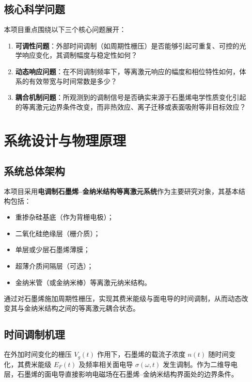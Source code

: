 \documentclass[12pt,a4paper]{article}
\begin{document}
\subsection{核心科学问题}

本项目重点围绕以下三个核心问题展开：

\begin{enumerate}
  \item \textbf{可调性问题}：外部时间调制（如周期性栅压）是否能够引起可重复、可控的光学响应变化，其调制幅度与稳定性如何？
  \item \textbf{动态响应问题}：在不同调制频率下，等离激元响应的幅度和相位特性如何，体系的有效带宽与时间常数是多少？
  \item \textbf{耦合机制问题}：所观测到的调制信号是否确实来源于石墨烯电学性质变化引起的等离激元边界条件改变，而非热效应、离子迁移或表面吸附等非目标效应？
\end{enumerate}

\section{系统设计与物理原理}

\subsection{系统总体架构}

本项目采用\textbf{电调制石墨烯–金纳米结构等离激元系统}作为主要研究对象，其基本结构包括：

\begin{itemize}
  \item 重掺杂硅基底（作为背栅电极）；
  \item 二氧化硅绝缘层（栅介质）；
  \item 单层或少层石墨烯薄膜；
  \item 超薄介质间隔层（可选）；
  \item 金纳米管（或金纳米棒）等离激元纳米结构。
\end{itemize}

通过对石墨烯施加周期性栅压，实现其费米能级与面电导的时间调制，从而动态改变其与金纳米结构之间的等离激元耦合状态。

\subsection{时间调制机理}

在外加时间变化的栅压 $V_g(t)$ 作用下，石墨烯的载流子浓度 $n(t)$ 随时间变化，其费米能级 $E_F(t)$ 及频率相关面电导 $\sigma(\omega,t)$ 发生调制。作为二维导电层，石墨烯的面电导直接影响电磁场在石墨烯–金纳米结构界面处的边界条件。
\end{document}
